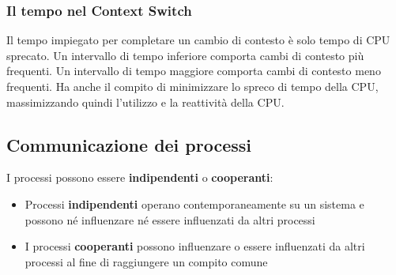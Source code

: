 \documentclass{article}
\begin{document}
\subsubsection*{Il tempo nel Context Switch}
Il tempo impiegato per completare un cambio di contesto è solo tempo di CPU sprecato. Un intervallo di tempo inferiore comporta cambi di contesto più frequenti. Un intervallo di tempo maggiore comporta cambi di contesto meno frequenti. Ha anche il compito di minimizzare lo spreco di tempo della CPU, massimizzando quindi l'utilizzo e la reattività della CPU. 
\subsection{Communicazione dei processi}

I processi possono essere \textbf{indipendenti} o \textbf{cooperanti}:
\begin{itemize}
    \item Processi \textbf{indipendenti} operano contemporaneamente su un sistema e possono né influenzare né essere influenzati da altri processi
    \item I processi \textbf{cooperanti} possono influenzare o essere influenzati da altri processi al fine di raggiungere un compito comune
\end{itemize}
\end{document}
